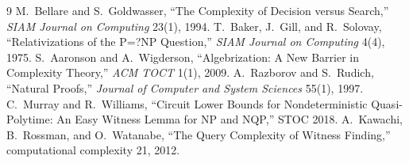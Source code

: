 \documentclass[11pt]{article}
\begin{document}
\begin{thebibliography}{9}
 M.~Bellare and S.~Goldwasser, ``The Complexity of Decision versus Search,'' \emph{SIAM Journal on Computing} 23(1), 1994.
 T.~Baker, J.~Gill, and R.~Solovay, ``Relativizations of the P=?NP Question,'' \emph{SIAM Journal on Computing} 4(4), 1975.
 S.~Aaronson and A.~Wigderson, ``Algebrization: A New Barrier in Complexity Theory,'' \emph{ACM TOCT} 1(1), 2009.
 A.~Razborov and S.~Rudich, ``Natural Proofs,'' \emph{Journal of Computer and System Sciences} 55(1), 1997.
 C.~Murray and R.~Williams, ``Circuit Lower Bounds for Nondeterministic Quasi-Polytime: An Easy Witness Lemma for NP and NQP,'' STOC 2018.
 A.~Kawachi, B.~Rossman, and O.~Watanabe, ``The Query Complexity of Witness Finding,'' computational complexity 21, 2012.
\end{thebibliography}

\end{document}
